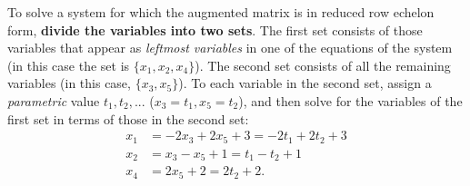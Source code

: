 To solve a system for which the augmented matrix is in reduced row echelon form, \textbf{divide the variables into two sets}.
The first set consists of those variables that appear as \emph{leftmost variables} in one of the equations of the system (in this case the set is \(\{ x_1, x_2, x_4 \}\)).
The second set consists of all the remaining variables (in this case, \(\{ x_3, x_5 \}\)).
To each variable in the second set, assign a \emph{parametric} value \(t_1, t_2, ...\) (\(x_3 = t_1, x_5 = t_2\)),
and then solve for the variables of the first set in terms of those in the second set:
\begin{align*}
    x_{1} & = -2 x_{3}+2 x_{5}+3 = -2 t_{1}+2 t_{2}+3 \\
    x_{2} & = x_{3}-x_{5}+1= t_{1}-t_{2}+1 \\
    x_{4} & = 2 x_{5}+2= 2 t_{2}+2 .
\end{align*}

